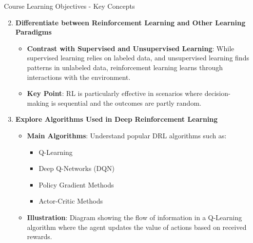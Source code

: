 \documentclass[aspectratio=169]{beamer}
\begin{document}
\begin{frame}[fragile]{Course Learning Objectives - Key Concepts}
    \begin{enumerate}
        \setcounter{enumi}{1}
        \item \textbf{Differentiate between Reinforcement Learning and Other Learning Paradigms}
            \begin{itemize}
                \item \textbf{Contrast with Supervised and Unsupervised Learning}: While supervised learning relies on labeled data, and unsupervised learning finds patterns in unlabeled data, reinforcement learning learns through interactions with the environment.
                \item \textbf{Key Point}: RL is particularly effective in scenarios where decision-making is sequential and the outcomes are partly random.
            \end{itemize}
        
        \item \textbf{Explore Algorithms Used in Deep Reinforcement Learning}
            \begin{itemize}
                \item \textbf{Main Algorithms}: Understand popular DRL algorithms such as:
                    \begin{itemize}
                        \item Q-Learning
                        \item Deep Q-Networks (DQN)
                        \item Policy Gradient Methods
                        \item Actor-Critic Methods
                    \end{itemize}
                \item \textbf{Illustration}: Diagram showing the flow of information in a Q-Learning algorithm where the agent updates the value of actions based on received rewards.
            \end{itemize}
    \end{enumerate}
\end{frame}
\end{document}
